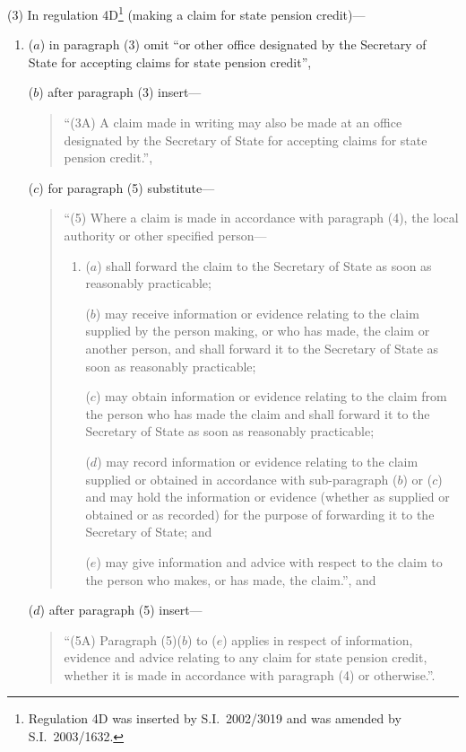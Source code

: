 \documentclass[12pt,a4paper]{article}
\begin{document}
(3) In regulation 4D\footnote{Regulation 4D was inserted by S.I.\ 2002/3019 and was amended by S.I.\ 2003/1632.} (making a claim for state pension credit)—
\begin{enumerate}\item[]
($a$) in paragraph (3) omit “or other office designated by the Secretary of State for accepting claims for state pension credit”,

($b$) after paragraph (3) insert—
\begin{quotation}
“(3A) A claim made in writing may also be made at an office designated by the Secretary of State for accepting claims for state pension credit.”,
\end{quotation}

($c$) for paragraph (5) substitute—
\begin{quotation}
“(5) Where a claim is made in accordance with paragraph (4), the local authority or other specified person—
\begin{enumerate}\item[]
($a$) shall forward the claim to the Secretary of State as soon as reasonably practicable;

($b$) may receive information or evidence relating to the claim supplied by the person making, or who has made, the claim or another person, and shall forward it to the Secretary of State as soon as reasonably practicable;

($c$) may obtain information or evidence relating to the claim from the person who has made the claim and shall forward it to the Secretary of State as soon as reasonably practicable;

($d$) may record information or evidence relating to the claim supplied or obtained in accordance with sub-\hspace{0pt}paragraph ($b$)  or ($c$)  and may hold the information or evidence (whether as supplied or obtained or as recorded) for the purpose of forwarding it to the Secretary of State; and

($e$) may give information and advice with respect to the claim to the person who makes, or has made, the claim.”,
    and 
\end{enumerate}
\end{quotation}

($d$) after paragraph (5) insert—
\begin{quotation}
“(5A) Paragraph (5)($b$)  to ($e$)  applies in respect of information, evidence and advice relating to any claim for state pension credit, whether it is made in accordance with paragraph (4) or otherwise.”.
\end{quotation}
\end{enumerate}
\end{document}
